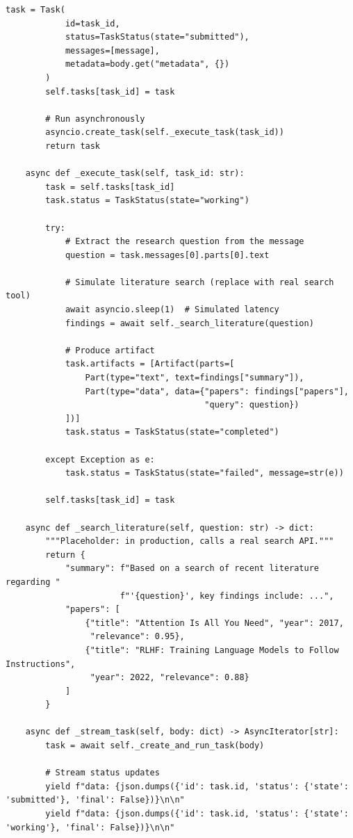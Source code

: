 \begin{lstlisting}[style=pythonstyle]
        task = Task(
            id=task_id,
            status=TaskStatus(state="submitted"),
            messages=[message],
            metadata=body.get("metadata", {})
        )
        self.tasks[task_id] = task

        # Run asynchronously
        asyncio.create_task(self._execute_task(task_id))
        return task

    async def _execute_task(self, task_id: str):
        task = self.tasks[task_id]
        task.status = TaskStatus(state="working")

        try:
            # Extract the research question from the message
            question = task.messages[0].parts[0].text

            # Simulate literature search (replace with real search tool)
            await asyncio.sleep(1)  # Simulated latency
            findings = await self._search_literature(question)

            # Produce artifact
            task.artifacts = [Artifact(parts=[
                Part(type="text", text=findings["summary"]),
                Part(type="data", data={"papers": findings["papers"],
                                        "query": question})
            ])]
            task.status = TaskStatus(state="completed")

        except Exception as e:
            task.status = TaskStatus(state="failed", message=str(e))

        self.tasks[task_id] = task

    async def _search_literature(self, question: str) -> dict:
        """Placeholder: in production, calls a real search API."""
        return {
            "summary": f"Based on a search of recent literature regarding "
                       f"'{question}', key findings include: ...",
            "papers": [
                {"title": "Attention Is All You Need", "year": 2017,
                 "relevance": 0.95},
                {"title": "RLHF: Training Language Models to Follow Instructions",
                 "year": 2022, "relevance": 0.88}
            ]
        }

    async def _stream_task(self, body: dict) -> AsyncIterator[str]:
        task = await self._create_and_run_task(body)

        # Stream status updates
        yield f"data: {json.dumps({'id': task.id, 'status': {'state': 'submitted'}, 'final': False})}\n\n"
        yield f"data: {json.dumps({'id': task.id, 'status': {'state': 'working'}, 'final': False})}\n\n"


\end{lstlisting}
